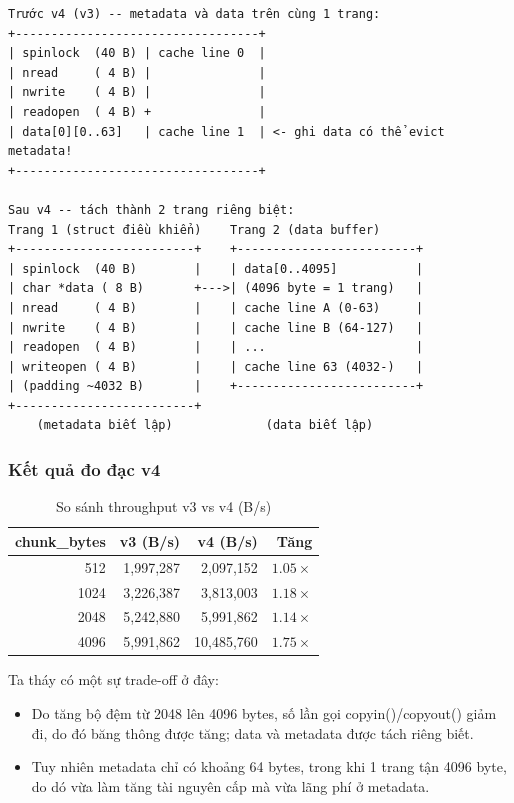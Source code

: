\documentclass[12pt,a4paper]{article}
\begin{document}
\begin{verbatim}
Trước v4 (v3) -- metadata và data trên cùng 1 trang:
+----------------------------------+
| spinlock  (40 B) | cache line 0  |
| nread     ( 4 B) |               |
| nwrite    ( 4 B) |               |
| readopen  ( 4 B) +               |
| data[0][0..63]   | cache line 1  | <- ghi data có thể evict metadata!
+----------------------------------+

Sau v4 -- tách thành 2 trang riêng biệt:
Trang 1 (struct điều khiển)    Trang 2 (data buffer)
+-------------------------+    +-------------------------+
| spinlock  (40 B)        |    | data[0..4095]           |
| char *data ( 8 B)       +--->| (4096 byte = 1 trang)   |
| nread     ( 4 B)        |    | cache line A (0-63)     |
| nwrite    ( 4 B)        |    | cache line B (64-127)   |
| readopen  ( 4 B)        |    | ...                     |
| writeopen ( 4 B)        |    | cache line 63 (4032-)   |
| (padding ~4032 B)       |    +-------------------------+
+-------------------------+
    (metadata biết lập)             (data biết lập)
\end{verbatim}


\subsubsection{Kết quả đo đạc v4}

\begin{table}[H]
\centering
\caption{So sánh throughput v3 vs v4 (B/s)}
\begin{tabular}{rrrr}
\toprule
\textbf{chunk\_bytes} & \textbf{v3 (B/s)} & \textbf{v4 (B/s)} & \textbf{Tăng} \\
\midrule
512  & 1,997,287 & 2,097,152  & $1.05\times$ \\
1024 & 3,226,387 & 3,813,003  & $1.18\times$ \\
2048 & 5,242,880 & 5,991,862  & $1.14\times$ \\
4096 & 5,991,862 & 10,485,760 & $1.75\times$ \\
\bottomrule
\end{tabular}
\end{table}

Ta tháy có một sự trade-off ở đây:
\begin{itemize}
    \item Do tăng bộ đệm từ 2048 lên 4096 bytes, số lần gọi copyin()/copyout() giảm đi, do đó băng thông được tăng; data và metadata được tách riêng biết.
    \item Tuy nhiên metadata chỉ có khoảng 64 bytes, trong khi 1 trang tận 4096 byte, do dó vừa làm tăng tài nguyên cấp mà vừa lãng phí ở metadata.
\end{itemize}
\end{document}

